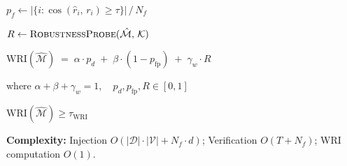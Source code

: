 \begin{algorithm*}[tp]
{  
  $p_f \leftarrow |\{i : \cos(\hat{r}_i,\, r_i) \geq \tau\}|\,/\,N_f$\;

  $R \leftarrow \textsc{RobustnessProbe}(\hat{\mathcal{M}},\, \mathcal{K})$\;

  \BlankLine
  \begin{tcolorbox}[colback=yellow!8, colframe=orange!70!black,
    boxrule=0.8pt, left=4pt, right=4pt, top=2pt, bottom=2pt]
  $\mathrm{WRI}(\hat{\mathcal{M}}) \;=\; \alpha \cdot p_d
    \;+\; \beta \cdot (1 - p_{\text{fp}})
    \;+\; \gamma_w \cdot R$\par
  \centering\small where $\alpha + \beta + \gamma_w = 1,\quad
    p_d, p_{\text{fp}}, R \in [0,1]$
  \end{tcolorbox}

  \Return $\mathrm{WRI}(\hat{\mathcal{M}}) \geq \tau_{\text{WRI}}$
    \;
}

\BlankLine
\textbf{Complexity:}
Injection $O(|\mathcal{D}| \cdot |\mathcal{V}| + N_f \cdot d)$;
Verification $O(T + N_f)$;
WRI computation $O(1)$.
\end{algorithm*}
